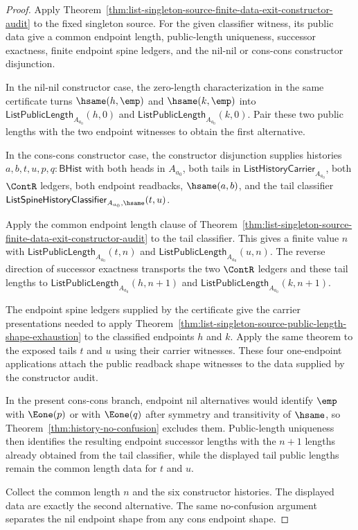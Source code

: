 \begin{proof}
Apply
Theorem~\ref{thm:list-singleton-source-finite-data-exit-constructor-audit} to
the fixed singleton source. For the given classifier witness, its public data
give a common endpoint length, public-length uniqueness, successor exactness,
finite endpoint spine ledgers, and the nil-nil or cons-cons constructor
disjunction.

In the nil-nil constructor case, the zero-length characterization in the same
certificate turns $\hsame(h,\emp)$ and $\hsame(k,\emp)$ into
$\mathsf{ListPublicLength}_{A_{a_0}}(h,0)$ and
$\mathsf{ListPublicLength}_{A_{a_0}}(k,0)$. Pair these two public lengths with
the two endpoint witnesses to obtain the first alternative.

In the cons-cons constructor case, the constructor disjunction supplies
histories $a,b,t,u,p,q:\mathsf{BHist}$ with both heads in $A_{a_0}$, both tails
in $\mathsf{ListHistoryCarrier}_{A_{a_0}}$, both $\ContR$ ledgers, both endpoint
readbacks, $\hsame(a,b)$, and the tail classifier
$\mathsf{ListSpineHistoryClassifier}_{A_{a_0},\hsame}(t,u)$.

Apply the common endpoint length clause of
Theorem~\ref{thm:list-singleton-source-finite-data-exit-constructor-audit} to
the tail classifier. This gives a finite value $n$ with
$\mathsf{ListPublicLength}_{A_{a_0}}(t,n)$ and
$\mathsf{ListPublicLength}_{A_{a_0}}(u,n)$. The reverse direction of successor
exactness transports the two $\ContR$ ledgers and these tail lengths to
$\mathsf{ListPublicLength}_{A_{a_0}}(h,n+1)$ and
$\mathsf{ListPublicLength}_{A_{a_0}}(k,n+1)$.

The endpoint spine ledgers supplied by the certificate give the carrier
presentations needed to apply
Theorem~\ref{thm:list-singleton-source-public-length-shape-exhaustion} to the
classified endpoints $h$ and $k$. Apply the same theorem to the exposed tails
$t$ and $u$ using their carrier witnesses. These four one-endpoint applications
attach the public readback shape witnesses to the data supplied by the
constructor audit.

In the present cons-cons branch, endpoint nil alternatives would identify
$\emp$ with $\Eone(p)$ or with $\Eone(q)$ after symmetry and transitivity of
$\hsame$, so Theorem~\ref{thm:history-no-confusion} excludes them.
Public-length uniqueness then identifies the resulting endpoint successor
lengths with the $n+1$ lengths already obtained from the tail classifier, while
the displayed tail public lengths remain the common length data for $t$ and
$u$.

Collect the common length $n$ and the six constructor histories. The displayed
data are exactly the second alternative. The same no-confusion argument
separates the nil endpoint shape from any cons endpoint shape.
\end{proof}

